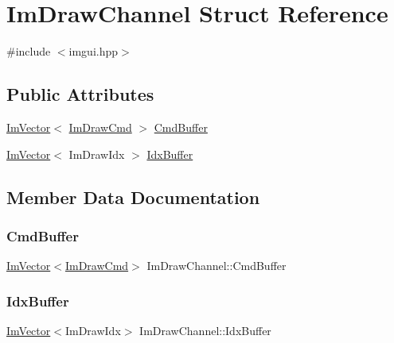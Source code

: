 \hypertarget{struct_im_draw_channel}{}\section{Im\+Draw\+Channel Struct Reference}
\label{struct_im_draw_channel}


{\ttfamily \#include $<$imgui.\+hpp$>$}

\subsection*{Public Attributes}
\begin{DoxyCompactItemize}
\item 
\hyperlink{class_im_vector}{Im\+Vector}$<$ \hyperlink{struct_im_draw_cmd}{Im\+Draw\+Cmd} $>$ \hyperlink{struct_im_draw_channel_abdaa17053d55fb6757c1971d410ceddf}{Cmd\+Buffer}
\item 
\hyperlink{class_im_vector}{Im\+Vector}$<$ Im\+Draw\+Idx $>$ \hyperlink{struct_im_draw_channel_a7fbed7d3523124fadd94859d5ac0fd67}{Idx\+Buffer}
\end{DoxyCompactItemize}


\subsection{Member Data Documentation}
\hypertarget{struct_im_draw_channel_abdaa17053d55fb6757c1971d410ceddf}{}\label{struct_im_draw_channel_abdaa17053d55fb6757c1971d410ceddf} 
\subsubsection{\texorpdfstring{Cmd\+Buffer}{CmdBuffer}}
{\footnotesize\ttfamily \hyperlink{class_im_vector}{Im\+Vector}$<$\hyperlink{struct_im_draw_cmd}{Im\+Draw\+Cmd}$>$ Im\+Draw\+Channel\+::\+Cmd\+Buffer}

\hypertarget{struct_im_draw_channel_a7fbed7d3523124fadd94859d5ac0fd67}{}\label{struct_im_draw_channel_a7fbed7d3523124fadd94859d5ac0fd67} 
\subsubsection{\texorpdfstring{Idx\+Buffer}{IdxBuffer}}
{\footnotesize\ttfamily \hyperlink{class_im_vector}{Im\+Vector}$<$Im\+Draw\+Idx$>$ Im\+Draw\+Channel\+::\+Idx\+Buffer}

